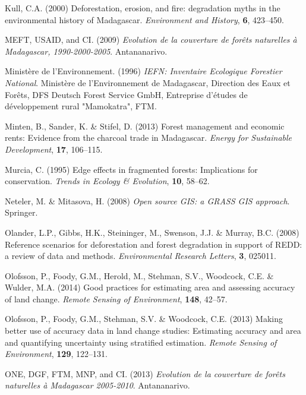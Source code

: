 \documentclass[]{article}
\theoremstyle{definition}
\theoremstyle{definition}
\theoremstyle{definition}
\theoremstyle{remark}
\begin{document}
\leavevmode\hypertarget{ref-Kull2000}{}%
Kull, C.A. (2000) Deforestation, erosion, and fire: degradation myths in
the environmental history of Madagascar. \emph{Environment and History},
\textbf{6}, 423--450.

\leavevmode\hypertarget{ref-MEFT2009}{}%
MEFT, USAID, and CI. (2009) \emph{Evolution de la couverture de forêts
naturelles à Madagascar, 1990-2000-2005}. Antananarivo.

\leavevmode\hypertarget{ref-IEFN1996}{}%
Ministère de l'Environnement. (1996) \emph{IEFN: Inventaire Ecologique
Forestier National}. Ministère de l'Environnement de Madagascar,
Direction des Eaux et Forêts, DFS Deutsch Forest Service GmbH,
Entreprise d'études de développement rural "Mamokatra", FTM.

\leavevmode\hypertarget{ref-Minten2013}{}%
Minten, B., Sander, K. \& Stifel, D. (2013) Forest management and
economic rents: Evidence from the charcoal trade in Madagascar.
\emph{Energy for Sustainable Development}, \textbf{17}, 106--115.

\leavevmode\hypertarget{ref-Murcia1995}{}%
Murcia, C. (1995) Edge effects in fragmented forests: Implications for
conservation. \emph{Trends in Ecology \& Evolution}, \textbf{10},
58--62.

\leavevmode\hypertarget{ref-Neteler2008}{}%
Neteler, M. \& Mitasova, H. (2008) \emph{Open source GIS: a GRASS GIS
approach}. Springer.

\leavevmode\hypertarget{ref-Olander2008}{}%
Olander, L.P., Gibbs, H.K., Steininger, M., Swenson, J.J. \& Murray,
B.C. (2008) Reference scenarios for deforestation and forest degradation
in support of REDD: a review of data and methods. \emph{Environmental
Research Letters}, \textbf{3}, 025011.

\leavevmode\hypertarget{ref-Olofsson2014}{}%
Olofsson, P., Foody, G.M., Herold, M., Stehman, S.V., Woodcock, C.E. \&
Wulder, M.A. (2014) Good practices for estimating area and assessing
accuracy of land change. \emph{Remote Sensing of Environment},
\textbf{148}, 42--57.

\leavevmode\hypertarget{ref-Olofsson2013}{}%
Olofsson, P., Foody, G.M., Stehman, S.V. \& Woodcock, C.E. (2013) Making
better use of accuracy data in land change studies: Estimating accuracy
and area and quantifying uncertainty using stratified estimation.
\emph{Remote Sensing of Environment}, \textbf{129}, 122--131.

\leavevmode\hypertarget{ref-ONE2013}{}%
ONE, DGF, FTM, MNP, and CI. (2013) \emph{Evolution de la couverture de
forêts naturelles à Madagascar 2005-2010}. Antananarivo.
\end{document}
